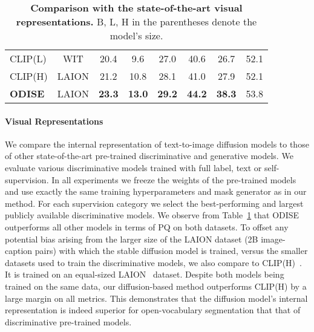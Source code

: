 \documentclass[10pt,twocolumn,letterpaper]{article}
\newcommand{\ourmethod}{ODISE}
\begin{document}
\begin{table}[]
\begin{tabular}{l|c|ccc|ccc}
\shline
\multicolumn{8}{l}{Pre-trained with text}                                                                                                  \\
\hline
CLIP(L)\cite{radford2021clip}      & WIT      & 20.4          & 9.6           & 27.0          & 40.6          & 26.7          & 52.1          \\
CLIP(H)\cite{radford2021clip}      & LAION    & 21.2          & 10.8          & 28.1          & 41.0          & 27.9          & 52.1          \\
\textbf{\ourmethod{}}                & LAION    & \textbf{23.3} & \textbf{13.0} & \textbf{29.2} & \textbf{44.2} & \textbf{38.3} & 53.8
\end{tabular}
\vspace{-1em}
\caption{
    \label{tab:pretrain}
    \textbf{Comparison with the state-of-the-art visual representations.} B, L, H in the parentheses denote the model's size. 
}
\vspace{-2em}
\end{table}

\paragraph{Visual Representations} 
We compare the internal representation of text-to-image diffusion models to those of other state-of-the-art pre-trained discriminative and generative models. We evaluate various discriminative models trained with full label, text or self-supervision.
In all experiments we freeze the weights of the pre-trained models and use exactly the same training hyperparameters and mask generator as in our method. 
For each supervision category we select the best-performing and largest publicly available discriminative models.  
We observe from Table~\ref{tab:pretrain} that \ourmethod{} outperforms all other models in terms of PQ on both datasets. 
To offset any potential bias arising from the larger size of the LAION dataset (2B image-caption pairs) with which the stable diffusion model is trained, versus the smaller datasets used to train the discriminative models, we also compare to CLIP(H)~\cite{ilharco2021openclip,radford2021clip}. It is trained on an equal-sized LAION~\cite{schuhmann2021laion} dataset. Despite both models being trained on the same data, our diffusion-based method outperforms CLIP(H) by a large margin on all metrics. This demonstrates that the diffusion model's internal representation is indeed superior for open-vocabulary segmentation that that of discriminative pre-trained models.
\end{document}
